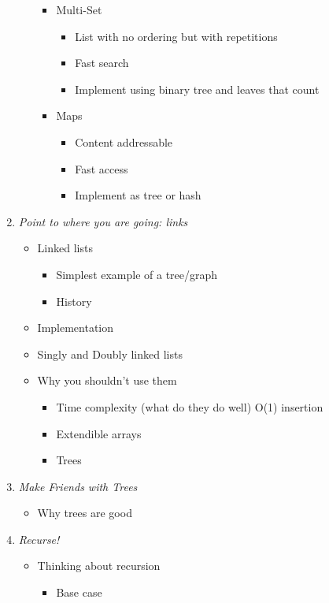 \documentclass{article}
\begin{document}
\begin{enumerate}
\begin{itemize}
\begin{itemize}
    \item Multi-Set
      \begin{itemize}
      \item List with no ordering but with repetitions
      \item Fast search
      \item Implement using binary tree and leaves that count
      \end{itemize}
    \item Maps
      \begin{itemize}
      \item Content addressable
      \item Fast access
      \item Implement as tree or hash
      \end{itemize}
    \end{itemize}
  \end{itemize}
\item \emph{Point to where you are going: links}
  \begin{itemize}
  \item Linked lists
    \begin{itemize}
    \item Simplest example of a tree/graph
    \item History
    \end{itemize}
  \item Implementation
  \item Singly and Doubly linked lists
  \item Why you shouldn't use them
    \begin{itemize}
    \item Time complexity (what do they do well) O(1) insertion
    \item Extendible arrays
    \item Trees
    \end{itemize}
  \end{itemize}
\item \emph{Make Friends with Trees}
  \begin{itemize}
  \item Why trees are good
  \end{itemize}
\item \emph{Recurse!}
  \begin{itemize}
  \item Thinking about recursion
    \begin{itemize}
    \item Base case

\end{itemize}
\end{itemize}
\end{enumerate}
\end{document}
